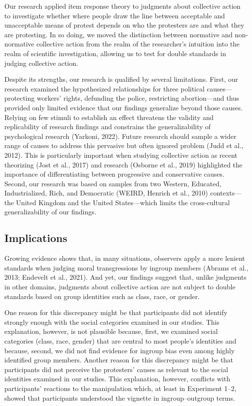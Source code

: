 \documentclass[12pt, letterpaper]{article}
\begin{document}
Our research applied item response theory to judgments about collective
action to investigate whether where people draw the line between
acceptable and unacceptable means of protest depends on who the
protesters are and what they are protesting. In so doing, we moved the
distinction between normative and non-normative collective action from
the realm of the researcher's intuition into the realm of scientific
investigation, allowing us to test for double standards in judging
collective action.

Despite its strengths, our research is qualified by several limitations.
First, our research examined the hypothesized relationships for three
political causes---protecting workers' rights, defunding the police,
restricting abortion---and thus provided only limited evidence that our
findings generalize beyond those causes. Relying on few stimuli to
establish an effect threatens the validity and replicability of research
findings and constrains the generalizability of psychological research
(Yarkoni, 2022). Future research should sample a wider range of causes
to address this pervasive but often ignored problem (Judd et al., 2012).
This is particularly important when studying collective action as recent
theorizing (Jost et al., 2017) and research (Osborne et al., 2019)
highlighted the importance of differentiating between progressive and
conservative causes. Second, our research was based on samples from two
Western, Educated, Industrialized, Rich, and Democratic (WEIRD, Henrich
et al., 2010) contexts---the United Kingdom and the United
States---which limits the cross-cultural generalizability of our
findings.

\hypertarget{implications}{%
\subsection{Implications}\label{implications}}

Growing evidence shows that, in many situations, observers apply a more
lenient standards when judging moral transgressions by ingroup members
(Abrams et al., 2013; Endevelt et al., 2021). And yet, our findings
suggest that, unlike judgments in other domains, judgments about
collective action are not subject to double standards based on group
identities such as class, race, or gender.

One reason for this discrepancy might be that participants did not
identify strongly enough with the social categories examined in our
studies. This explanation, however, is not plausible because, first, we
examined social categories (class, race, gender) that are central to
most people's identities and because, second, we did not find evidence
for ingroup bias even among highly identified group members. Another
reason for this discrepancy might be that participants did not perceive
the protesters' causes as relevant to the social identities examined in
our studies. This explanation, however, conflicts with participants'
reactions to the manipulation which, at least in Experiment 1--2, showed
that participants understood the vignette in ingroup--outgroup terms.
\end{document}
